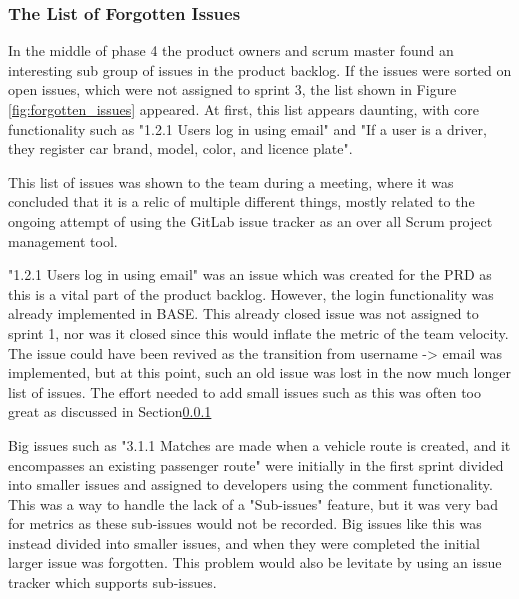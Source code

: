 \documentclass{article}
\begin{document}
\subsubsection{The List of Forgotten Issues}

In the middle of phase 4 the product owners and scrum master found an interesting sub group of issues in the product backlog. If the issues were sorted on open issues, which were not assigned to sprint 3, the list shown in Figure \ref{fig:forgotten_issues} appeared. At first, this list appears daunting, with core functionality such as "1.2.1 Users log in using email" and "If a user is a driver, they register car brand, model, color, and licence plate".

This list of issues was shown to the team during a meeting, where it was concluded that it is a relic of multiple different things, mostly related to the ongoing attempt of using the GitLab issue tracker as an over all Scrum project management tool.

"1.2.1 Users log in using email" was an issue which was created for the PRD as this is a vital part of the product backlog. However, the login functionality was already implemented in BASE. This already closed issue was not assigned to sprint 1, nor was it closed since this would inflate the metric of the team velocity. The issue could have been revived as the transition from username -> email was implemented, but at this point, such an old issue was lost in the now much longer list of issues. The effort needed to add small issues such as this was often too great as discussed in Section\ref{}

Big issues such as "3.1.1 Matches are made when a vehicle route is created, and it encompasses an existing passenger route" were initially in the first sprint divided into smaller issues and assigned to developers using the comment functionality. This was a way to handle the lack of a "Sub-issues" feature, but it was very bad for metrics as these sub-issues would not be recorded. Big issues like this was instead divided into smaller issues, and when they were completed the initial larger issue was forgotten. This problem would also be levitate by using an issue tracker which supports sub-issues.
\end{document}
